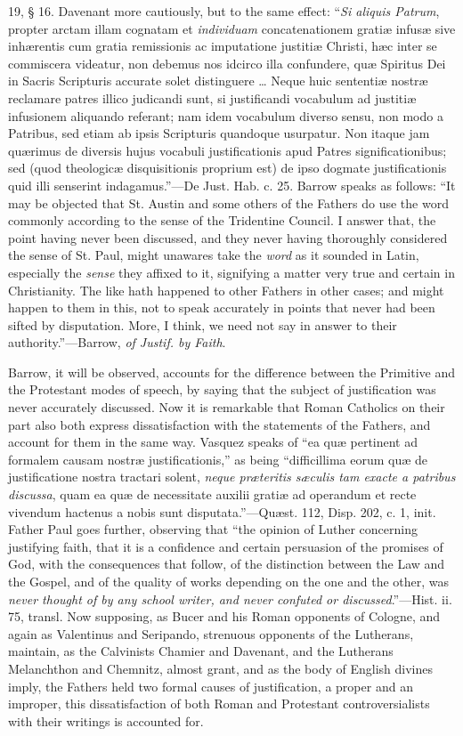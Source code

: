 19, § 16. Davenant more cautiously, but to the same effect: ``\emph{Si
aliquis Patrum}, propter arctam illam cognatam et \emph{individuam}
concatenationem gratiæ infusæ sive inhærentis cum gratia
remissionis ac imputatione justitiæ Christi, hæc inter se commiscera
videatur, non debemus nos idcirco illa confundere, quæ Spiritus
Dei in Sacris Scripturis accurate solet distinguere … Neque huic
sententiæ nostræ reclamare patres illico judicandi sunt, si
justificandi vocabulum ad justitiæ infusionem aliquando referant; nam
idem vocabulum diverso sensu, non modo a Patribus, sed etiam ab ipsis
Scripturis quandoque usurpatur. Non itaque jam quærimus de diversis
hujus vocabuli justificationis apud Patres significationibus; sed (quod
theologicæ disquisitionis proprium est) de ipso dogmate
justificationis quid illi senserint indagamus.''—De Just. Hab.
c. 25. Barrow speaks as follows: ``It may be objected that St.
Austin and some others of the Fathers do use the word commonly
according to the sense of the Tridentine Council. I answer that, the
point having never been discussed, and they never having thoroughly
considered the sense of St. Paul, might unawares take the \emph{word}
as it sounded in Latin, especially the \emph{sense} they affixed to
it, signifying a matter very true and certain in Christianity. The
like hath happened to other Fathers in other cases; and might happen
to them in this, not to speak accurately in points that never had been
sifted by disputation. More, I think, we need not say in answer to
their authority.''—Barrow, \emph{of Justif. by Faith}.

Barrow, it will be observed, accounts for the difference between
the Primitive and the Protestant modes of speech, by saying that the
subject of justification was never accurately discussed. Now it is
remarkable that Roman Catholics on their part also both express
dissatisfaction with the statements of the Fathers, and account for
them in the same way. Vasquez speaks of ``ea quæ pertinent ad
formalem causam nostræ justificationis,'' as being ``difficillima
eorum quæ de justificatione nostra tractari solent, \emph{neque
præteritis sæculis tam exacte a patribus discussa}, quam ea quæ
de necessitate auxilii gratiæ ad operandum et recte vivendum hactenus
a nobis sunt disputata.''—Quæst. 112, Disp. 202, c. 1, init.
Father Paul goes further, observing that ``the opinion of Luther concerning justifying faith, that it is a confidence and
certain persuasion of the promises of God, with the consequences that
follow, of the distinction between the Law and the Gospel, and of the
quality of works depending on the one and the other, was \emph{never
thought of by any school writer, and never confuted or discussed}.''—Hist.
ii. 75, transl. Now supposing, as Bucer and his Roman opponents of
Cologne, and again as Valentinus and Seripando, strenuous opponents of
the Lutherans, maintain, as the Calvinists Chamier and Davenant, and
the Lutherans Melanchthon and Chemnitz, almost grant, and as the body
of English divines imply, the Fathers held two formal causes of
justification, a proper and an improper, this dissatisfaction of both
Roman and Protestant controversialists with their writings is
accounted for.

